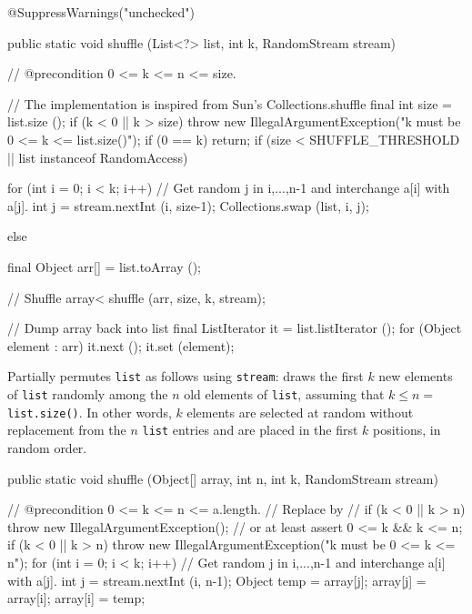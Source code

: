 \begin{code}
\begin{hide}@SuppressWarnings("unchecked")\end{hide}
   public static void shuffle (List<?> list, int k, RandomStream stream)\begin{hide} {
      // @precondition 0 <= k <= n <= size.

      // The implementation is inspired from Sun's Collections.shuffle
      final int size = list.size ();
      if (k < 0 || k > size)
         throw new IllegalArgumentException("k must be   0 <= k <= list.size()");
      if (0 == k) return;
      if (size < SHUFFLE_THRESHOLD || list instanceof RandomAccess) {
         for (int i = 0; i < k; i++) {
            // Get random j in {i,...,n-1} and interchange a[i] with a[j].
            int j = stream.nextInt (i, size-1);
            Collections.swap (list, i, j);
         }

      } else {
         final Object arr[] = list.toArray ();

         // Shuffle array<
         shuffle (arr, size, k, stream);

         // Dump array back into list
         final ListIterator it = list.listIterator ();
         for (Object element : arr) {
            it.next ();
            it.set (element);
         }
      }
   }\end{hide}
\end{code}
\begin{tabb} Partially permutes \texttt{list} as follows using \texttt{stream}:
 draws the first $k$ new elements of \texttt{list} randomly among the $n$ old
 elements of \texttt{list}, assuming that $k \le n = $ \texttt{list.size()}.
 In other words, $k$ elements are selected at random without replacement from
 the $n$ \texttt{list} entries and are placed in the first $k$ positions,
 in random order.
\end{tabb}
\begin{htmlonly}
\end{htmlonly}
\begin{code}

   public static void shuffle (Object[] array, int n, int k,
                               RandomStream stream)\begin{hide} {
      // @precondition 0 <= k <= n <= a.length.
      // Replace by 
      // if (k < 0 || k > n) throw new IllegalArgumentException();
      // or at least assert 0 <= k && k <= n;
      if (k < 0 || k > n)
         throw new IllegalArgumentException("k must be   0 <= k <= n");
      for (int i = 0; i < k; i++) {
         // Get random j in {i,...,n-1} and interchange a[i] with a[j].
         int j = stream.nextInt (i, n-1);
         Object temp = array[j];
         array[j] = array[i];
         array[i] = temp;
      }
   }\end{hide}
\end{code}
